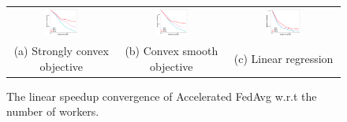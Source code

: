 \begin{figure}
\centering
\begin{tabular}{ccc}
\hspace{-2em}\includegraphics[width=0.33\textwidth]{fig/paper-nesterovspeedupNodesT-min-w8a-epsilon0131-reg1e-05.pdf} & 
\includegraphics[width=0.33\textwidth]{fig/paper-nesterovspeedupNodesT-min-w8a-epsilon0134-reg0.pdf}
& 
\includegraphics[width=0.33\textwidth]{fig/paper-lrnesterovspeedupNodesT-min-linearregressionw8a-epsilon002-reg0.pdf}\\
(a) Strongly convex objective & (b) Convex smooth objective & (c) Linear regression
	\end{tabular}
\caption{The linear speedup convergence of Accelerated FedAvg w.r.t the number of workers. }
\label{fig:nesterov}
\end{figure}

